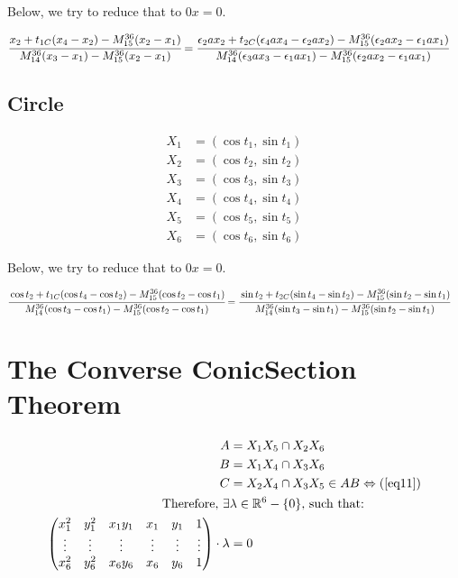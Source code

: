 \documentclass[12pt]{article}
\begin{document}
Below, we try to reduce that to $0x = 0$.

\begin{align}
\cfrac{x_2 + t_{1C} (x_4 - x_2) - M_{15}^{36}(x_2 - x_1)}{M_{14}^{36} (x_3 - x_1) - M_{15}^{36}(x_2 - x_1)} &=\cfrac{\epsilon_2 ax_2 + t_{2C} (\epsilon_4 ax_4 - \epsilon_2 ax_2) - M_{15}^{36}(\epsilon_2 ax_2 - \epsilon_1 ax_1)}{M_{14}^{36}(\epsilon_3 ax_3 - \epsilon_1 ax_1) - M_{15}^{36}(\epsilon_2 ax_2 - \epsilon_1 ax_1)}
\end{align}

\subsection{Circle}

\begin{align}
  X_1 &= (\cos t_1, \sin t_1) \\ 
  X_2 &= (\cos t_2, \sin t_2) \\ 
  X_3 &= (\cos t_3, \sin t_3) \\ 
  X_4 &= (\cos t_4, \sin t_4) \\ 
  X_5 &= (\cos t_5, \sin t_5) \\ 
  X_6 &= (\cos t_6, \sin t_6) 
\end{align}

Below, we try to reduce that to $0x = 0$.

\footnotesize

\begin{align}
\cfrac{\cos t_2 + t_{1C} (\cos t_4 - \cos t_2) - M_{15}^{36}(\cos t_2 - \cos t_1)}{M_{14}^{36} (\cos t_3 - \cos t_1) - M_{15}^{36}(\cos t_2 - \cos t_1)} &=\cfrac{\sin t_2 + t_{2C} (\sin t_4 - \sin t_2) - M_{15}^{36}(\sin t_2 - \sin t_1)}{M_{14}^{36}(\sin t_3 - \sin t_1) - M_{15}^{36}(\sin t_2 - \sin t_1)}
\end{align}

\normalsize

\newpage

\section{The Converse ConicSection Theorem}

\begin{align}
    A &= X_1 X_5 \cap X_2 X_6 \\
    B &= X_1 X_4 \cap X_3 X_6 \\
    C &= X_2 X_4 \cap X_3 X_5 \in AB\Leftrightarrow (\ref{eq11}) \\
    \text{Therefore, } \exists &\lambda\in\mathbb{R}^6-\{0\}\text{, such that:} \nonumber \\
    \begin{pmatrix}
        x_1^2 & y_1^2 & x_1 y_1 & x_1 & y_1 & 1 \\
        \vdots & \vdots & \vdots & \vdots & \vdots & \vdots \\
        x_6^2 & y_6^2 & x_6 y_6 & x_6 & y_6 & 1 
    \end{pmatrix}\cdot \lambda &= 0
\end{align}
\end{document}
